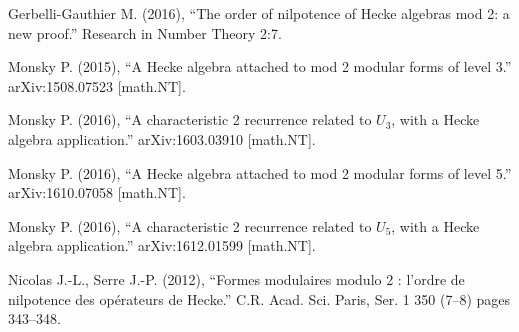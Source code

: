 \documentclass{monsky2009}
\begin{document}


\begin{thebibliography}{00}




 Gerbelli-Gauthier M. (2016),  ``The order of nilpotence of Hecke algebras mod 2: a new proof.'' Research in Number Theory 2:7.


 Monsky P. (2015), ``A Hecke algebra attached to mod 2 modular forms of level 3.'' arXiv:1508.07523 [math.NT].

 Monsky P. (2016), ``A characteristic 2 recurrence related to $U_{3}$, with a Hecke algebra application.'' arXiv:1603.03910 [math.NT].

 Monsky P. (2016), ``A Hecke algebra attached to mod 2 modular forms of level 5.'' arXiv:1610.07058 [math.NT].

 Monsky P. (2016), ``A characteristic 2 recurrence related to $U_{5}$, with a Hecke algebra application.'' arXiv:1612.01599 [math.NT].

 Nicolas J.-L., Serre J.-P. (2012), ``Formes modulaires modulo 2 : l'ordre de nilpotence des op\'{e}rateurs de Hecke.'' C.R. Acad. Sci. Paris, Ser. 1  350 (7--8) pages 343--348.





\end{thebibliography}
\end{document}
